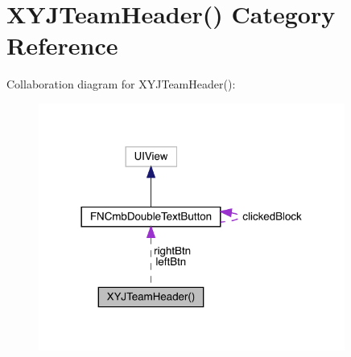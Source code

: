 \hypertarget{category_x_y_j_team_header_07_08}{}\section{X\+Y\+J\+Team\+Header() Category Reference}
\label{category_x_y_j_team_header_07_08}


Collaboration diagram for X\+Y\+J\+Team\+Header()\+:\nopagebreak
\begin{figure}[H]
\begin{center}
\leavevmode
\includegraphics[width=285pt]{category_x_y_j_team_header_07_08__coll__graph}
\end{center}
\end{figure}
